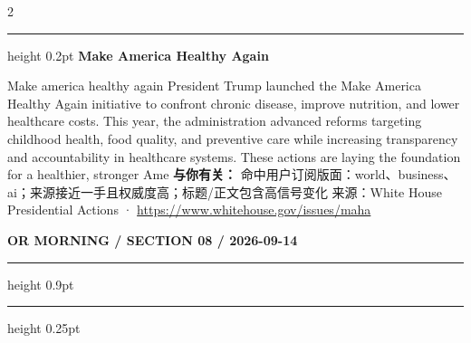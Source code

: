 \documentclass[10.5pt]{ctexart}
\begin{document}
\begin{multicols}{2}
\vspace{2mm}
\hrule height 0.2pt
\vspace{2mm}
{\large\bfseries Make America Healthy Again}\par
Make america healthy again President Trump launched the Make America Healthy Again initiative to confront chronic disease, improve nutrition, and lower healthcare costs. This year, the administration advanced reforms targeting childhood health, food quality, and preventive care while increasing transparency and accountability in healthcare systems. These actions are laying the foundation for a healthier, stronger Ame
\textbf{与你有关：} 命中用户订阅版面：world、business、ai；来源接近一手且权威度高；标题/正文包含高信号变化
{\footnotesize\color{ormuted} 来源：White House Presidential Actions · \url{https://www.whitehouse.gov/issues/maha}}
\end{multicols}
\newpage
{\small\bfseries OR MORNING / SECTION 08 / 2026-09-14}
\vspace{2mm}
\hrule height 0.9pt
\vspace{1.5mm}
\hrule height 0.25pt
\vspace{4mm}
\end{document}
